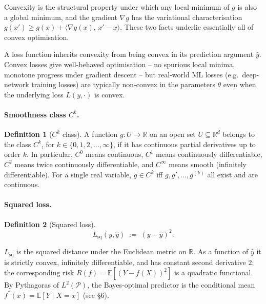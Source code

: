 \documentclass[11pt]{article}
\theoremstyle{definition}
\newtheorem{definition}{Definition}
\begin{document}
\begin{mathnote}
Convexity is the structural property under which any local minimum of $g$
is also a global minimum, and the gradient $\nabla g$ has the variational
characterisation
$g(x') \geq g(x) + \langle \nabla g(x),\, x' - x\rangle$. These two facts
underlie essentially all of convex optimisation.
\end{mathnote}

\begin{mlnote}
A loss function inherits convexity from being convex in its prediction
argument $\hat y$. Convex losses give well-behaved optimisation -- no spurious
local minima, monotone progress under gradient descent -- but real-world ML
losses (e.g.\ deep-network training losses) are typically non-convex in the
parameters $\theta$ even when the underlying loss $L(y, \cdot)$ is convex.
\end{mlnote}

\paragraph{Smoothness class $C^{k}$.}

\begin{definition}[$C^{k}$ class]
A function $g : U \to \mathbb{R}$ on an open set $U \subseteq \mathbb{R}^{d}$
belongs to the class $C^{k}$, for $k \in \{0, 1, 2, \dots, \infty\}$, if it
has continuous partial derivatives up to order $k$. In particular, $C^{0}$
means continuous, $C^{1}$ means continuously differentiable, $C^{2}$ means
twice continuously differentiable, and $C^{\infty}$ means smooth
(infinitely differentiable). For a single real variable, $g \in C^{k}$
iff $g, g', \dots, g^{(k)}$ all exist and are continuous.
\end{definition}

\paragraph{Squared loss.}

\begin{definition}[Squared loss]
\[
  L_{\mathrm{sq}}(y, \hat y) \;:=\; (y - \hat y)^{2}.
\]
\end{definition}

\begin{mathnote}
$L_{\mathrm{sq}}$ is the squared distance under the Euclidean metric on
$\mathbb{R}$. As a function of $\hat y$ it is strictly convex, infinitely
differentiable, and has constant second derivative $2$; the corresponding
risk $R(f) = \mathbb{E}[(Y - f(X))^2]$ is a quadratic functional. By
Pythagoras of $L^2(\mathcal{P})$, the Bayes-optimal predictor is the
conditional mean $f^\ast(x) = \mathbb{E}[Y \mid X = x]$ (see \S 6).
\end{mathnote}
\end{document}
